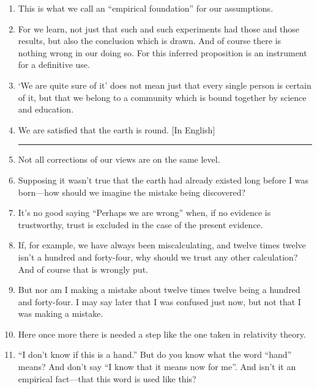 \documentclass{book}
\begin{document}
\begin{enumerate}
\item
This is what we call an ``empirical foundation'' for our assumptions.

\item
For we learn, not just that such and such experiments had those and those
results, but also the conclusion which is drawn. And of course there is nothing
wrong in our doing so. For this inferred proposition is an instrument for a
definitive use.

\item
`We are quite sure of it' does not mean just that every single person is
certain of it, but that we belong to a community which is bound together by
science and education.

\item
We are satisfied that the earth is round. {[}In English{]}

\begin{center}\rule{0.5\linewidth}{\linethickness}\end{center}

\item
Not all corrections of our views are on the same level.

\item
Supposing it wasn't true that the earth had already existed long before I was
born---how should we imagine the mistake being discovered?

\item
It's no good saying ``Perhaps we are wrong'' when, if no evidence is
trustworthy, trust is excluded in the case of the present evidence.

\item
If, for example, we have always been miscalculating, and twelve times twelve
isn't a hundred and forty-four, why should we trust any other calculation? And
of course that is wrongly put.

\item
But nor am I making a mistake about twelve times twelve being a hundred and
forty-four. I may say later that I was confused just now, but not that I was
making a mistake.

\item
Here once more there is needed a step like the one taken in relativity theory.

\item
``I don't know if this is a hand.'' But do you know what the word ``hand''
means? And don't say ``I know that it means now for me''. And isn't it an
empirical fact---that this word is used like this?


\end{enumerate}
\end{document}
